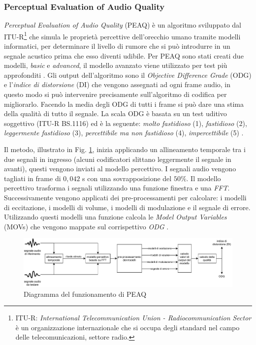 \subsubsection{Perceptual Evaluation of Audio Quality}
\textit{Perceptual Evaluation of Audio Quality} (PEAQ) è un algoritmo sviluppato dal ITU-R\footnote{ITU-R: \textit{International Telecommunication Union - Radiocommunication Sector} è un organizzazione internazionale che si occupa degli standard nel campo delle telecomunicazioni, settore radio.} che simula le proprietà percettive dell'orecchio umano tramite modelli informatici, per determinare il livello di rumore che si può introdurre in un segnale acustico prima che esso diventi udibile. Per PEAQ sono stati creati due modelli, \textit{basic} e \textit{advanced}, il modello avanzato viene utilizzato per test più approfonditi \parencite{UlovecK2018PAQA}. Gli output dell'algoritmo sono il \textit{Objective Difference Grade} (ODG) e l'\textit{indice di distorsione} (DI) che vengono assegnati ad ogni frame audio, in questo modo si può intervenire precisamente sull'algoritmo di codifica per migliorarlo. Facendo la media degli ODG di tutti i frame si può dare una stima della qualità di tutto il segnale. La scala ODG è basata su un test uditivo soggettivo (ITU-R BS.1116) ed è la seguente: \textit{molto fastidioso} (1), \textit{fastidioso} (2), \textit{leggermente fastidioso} (3), \textit{percettibile ma non fastidioso} (4), \textit{impercettibile} (5) \parencite{PoctaPeter2015SaOA}.

Il metodo, illustrato in Fig. \ref{fig:PEAQ}, inizia applicando un allineamento temporale tra i due segnali in ingresso (alcuni codificatori slittano leggermente il segnale in avanti), questi vengono inviati al modello percettivo. I segnali audio vengono tagliati in frame di $0,042$ s con una sovrapposizione del $50\%$. Il modello percettivo trasforma i segnali utilizzando una funzione finestra e una \textit{FFT}. Successivamente vengono applicati dei pre-processamenti per calcolare: i modelli di eccitazione, i modelli di volume, i modelli di modulazione e il segnale di errore. Utilizzando questi modelli una funzione calcola le \textit{Model Output Variables} (MOVs) che vengono mappate sul corrispettivo \textit{ODG} \parencite{PEAQ}.

\begin{figure}[H]
	\includegraphics[width=\linewidth]{immagini/PEAQ}
	\caption{Diagramma del funzionamento di PEAQ}	
	\label{fig:PEAQ}
\end{figure}



